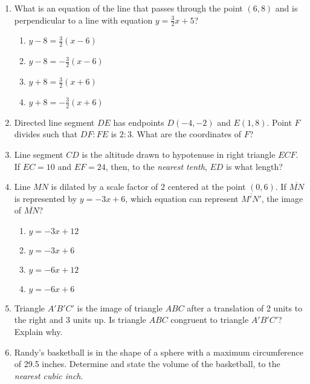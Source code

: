 \documentclass[12pt, oneside]{article}
\begin{document}
\begin{enumerate}[itemsep=0.5cm]
\item What is an equation of the line that passes through the point $(6,8)$
and is perpendicular to a line with equation $y=\frac{3}{2}x+5$?
  \begin{multicols}{2}
    \begin{enumerate}
      \item $y-8=\frac{3}{2}(x-6)$
      \item $y-8=-\frac{3}{2}(x-6)$ 
      \item $y+8=\frac{3}{2}(x+6)$
      \item $y+8=-\frac{3}{2}(x+6)$
    \end{enumerate}
  \end{multicols}

\item Directed line segment $DE$ has endpoints $D(-4, -2)$ and $E(1,8)$.
Point $F$ divides such that $DF:FE$ is $2:3$. What are the coordinates
of $F$?

\item Line segment $CD$ is the altitude drawn to hypotenuse in right
triangle $ECF$. If $EC=10$ and $EF=24$, then, to the \emph{nearest
tenth}, $ED$ is what length?

\item Line $MN$ is dilated by a scale factor of 2 centered at the point $(0,6)$. If $\overline{MN}$ is represented by $y=-3x+6$, which equation can represent $\overline{M'N'}$, the image of $\overline{MN}$?
  \begin{multicols}{2}
    \begin{enumerate}
      \item $y=-3x+12$
      \item $y=-3x+6$ 
      \item $y=-6x+12$
      \item $y=-6x+6$
    \end{enumerate}
  \end{multicols}

\item Triangle $A'B'C'$ is the image of triangle $ABC$ after a translation of 2 units to the right and 3 units up. Is triangle $ABC$ congruent to triangle $A'B'C'$? Explain why.

\item Randy's basketball is in the shape of a sphere with a maximum circumference of 29.5 inches. Determine and state the volume of the basketball, to the \emph{nearest cubic inch}.

\end{enumerate}
\end{document}
